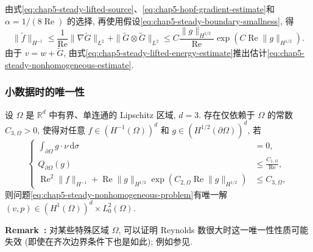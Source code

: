 \begin{Proof}
由式\eqref{eq:chap5-steady-lifted-source}、\eqref{eq:chap5-hopf-gradient-estimate}和 $\alpha=1/(8\operatorname{Re})$ 的选择, 再使用假设\eqref{eq:chap5-steady-boundary-smallness}, 得
\[
 \|\widetilde f\|_{H^{-1}}
 \leq\frac1{\operatorname{Re}}\|\nabla\widetilde G\|_{L^2}
 +\|\widetilde G\otimes\widetilde G\|_{L^2}
 \leq C\frac{\|g\|_{H^{1/2}}}{\operatorname{Re}}
 \exp\!\left(C\operatorname{Re}\|g\|_{H^{1/2}}\right).
\]
由于 $v=w+\widetilde G$, 由式\eqref{eq:chap5-steady-lifted-energy-estimate}推出估计\eqref{eq:chap5-steady-nonhomogeneous-estimate}.
\end{Proof}

\subsubsection{小数据时的唯一性}
\label{subsec:chap5-steady-small-data-uniqueness}

\begin{Theorem}
\label{thm:chap5-steady-small-data-uniqueness}
设 $\Omega$ 是 $\mathbb R^d$ 中有界、单连通的 Lipschitz 区域, $d=3$. 存在仅依赖于 $\Omega$ 的常数 $C_{3,\Omega}>0$, 使得对任意 $f\in(H^{-1}(\Omega))^d$ 和 $g\in(H^{1/2}(\partial\Omega))^d$, 若
\[
 \left\{
 \begin{aligned}
 \int_{\partial\Omega}g\cdot\nu\,\mathrm d\sigma&=0,\\
 Q_{\partial\Omega}(g)&\leq\frac{C_{1,\Omega}}{\operatorname{Re}},\\
 \operatorname{Re}^2\|f\|_{H^{-1}}
 +\operatorname{Re}\|g\|_{H^{1/2}}
 \exp\!\left(C_{2,\Omega}\operatorname{Re}\|g\|_{H^{1/2}}\right)
 &\leq C_{3,\Omega},
 \end{aligned}
 \right.
\]
则问题\eqref{eq:chap5-steady-nonhomogeneous-problem}有唯一解 $(v,p)\in(H^1(\Omega))^d\times L_0^2(\Omega)$.
\end{Theorem}

\par\noindent{}\textbf{Remark~\thechapterfivesectionthreeremark:}\label{rem:chap5-steady-high-reynolds-nonuniqueness}
对某些特殊区域 $\Omega$, 可以证明 Reynolds 数很大时这一唯一性性质可能失效 (即使在齐次边界条件下也是如此); 例如参见.

